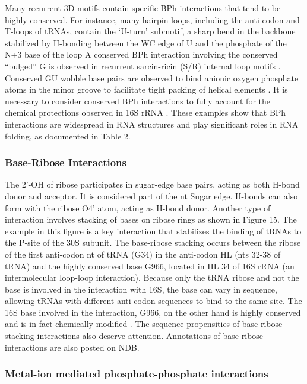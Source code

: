 Many recurrent 3D motifs contain specific BPh interactions that tend to be
highly conserved. For instance, many hairpin loops, including the anti-codon and
T-loops of tRNAs, contain the ‘U-turn' submotif, a sharp bend in the backbone
stabilized by H-bonding between the WC edge of U and the phosphate of the N+3
base of the loop \cite{Quigley1976} A conserved BPh interaction involving the
conserved ``bulged'' G is observed in recurrent sarcin-ricin (S/R) internal loop
motifs \cite{Correll1998}. Conserved GU wobble base pairs are observed to bind
anionic oxygen phosphate atoms in the minor groove to facilitate tight packing
of helical elements \cite{Mokdad2006b}. It is necessary to consider conserved
BPh interactions to fully account for the chemical protections observed in 16S
rRNA \cite{Merryman1999, Stern1988}. These examples show that BPh interactions
are widespread in RNA structures and play significant roles in RNA folding, as
documented in Table 2.

\subsubsection{Base-Ribose Interactions}

The 2'-OH of ribose participates in sugar-edge base pairs, acting as both H-bond
donor and acceptor. It is considered part of the nt Sugar edge. H-bonds can also
form with the ribose O4' atom, acting as H-bond donor. Another type of
interaction involves stacking of bases on ribose rings as shown in Figure 15.
The example in this figure is a key interaction that stabilizes the binding of
tRNAs to the P-site of the 30S subunit. The base-ribose stacking occurs between
the ribose of the first anti-codon nt of tRNA (G34) in the anti-codon HL (nts
32-38 of tRNA) and the highly conserved base G966, located in HL 34 of 16S rRNA
(an intermolecular loop-loop interaction). Because only the tRNA ribose and not
the base is involved in the interaction with 16S, the base can vary in sequence,
allowing tRNAs with different anti-codon sequences to bind to the same site. The
16S base involved in the interaction, G966, on the other hand is highly
conserved and is in fact chemically modified \cite{Burakovsky2012}. The sequence
propensities of base-ribose stacking interactions also deserve attention.
Annotations of base-ribose interactions are also posted on NDB.

\subsubsection{Metal-ion mediated phosphate-phosphate interactions}

